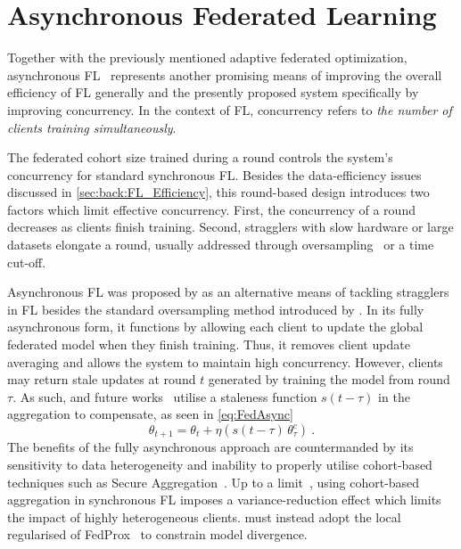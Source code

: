 \section{Asynchronous Federated Learning}
Together with the previously mentioned adaptive federated optimization, asynchronous FL~\citep{AsyncFedOpt,FedBuff,PAPAYA,AsynchronousFLonHetDevicesSurvey,AsyncrhonousOnlineFL} represents another promising means of improving the overall efficiency of FL generally and the presently proposed system specifically by improving concurrency. In the context of FL, concurrency refers to \emph{the number of clients training simultaneously}.

The federated cohort size trained during a round controls the system's concurrency for standard synchronous FL. Besides the data-efficiency issues discussed in \cref{sec:back:FL_Efficiency}, this round-based design introduces two factors which limit effective concurrency. First, the concurrency of a round decreases as clients finish training. Second, stragglers with slow hardware or large datasets elongate a round, usually addressed through oversampling~\citep{ScaleSystemDesign} or a time cut-off.

Asynchronous FL was proposed by \citet{AsyncFedOpt} as an alternative means of tackling stragglers in FL besides the standard oversampling method introduced by \citet{ScaleSystemDesign}. In its fully asynchronous form, it functions by allowing each client to update the global federated model when they finish training. Thus, it removes client update averaging and allows the system to maintain high concurrency. However, clients may return stale updates at round $t$ generated by training the model from round $\tau$. As such, \citet{AsyncFedOpt} and future works~\citep{FedBuff,PAPAYA} utilise a staleness function $s(t-\tau)$ in the aggregation to compensate, as seen in \cref{eq:FedAsync}
\begin{equation} \label{eq:FedAsync}
    \theta_{t+1} = \theta_t + \eta  \left( s(t-\tau)\, \theta_{\tau}^c \right) \ .
\end{equation}
The benefits of the fully asynchronous approach are countermanded by its sensitivity to data heterogeneity and inability to properly utilise cohort-based techniques such as Secure Aggregation~\citep{SecAggOG}. Up to a limit~\citep{LargeCohorts,UnderstandingModelAveragingInFL,FedBuff,PAPAYA}, using cohort-based aggregation in synchronous FL imposes a variance-reduction effect which limits the impact of highly heterogeneous clients. \citet{AsyncFedOpt} must instead adopt the local regularised of FedProx~\citep{FedProx} to constrain model divergence.

